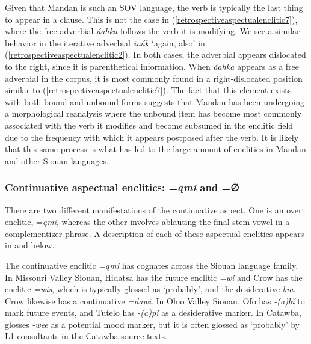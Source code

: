 Given that Mandan is such an SOV language, the verb is typically the last thing to appear in a clause. This is not the case in (\ref{retrospectiveaspectualenclitic7}), where the free adverbial \textit{áahka} follows the verb it is modifying. We see a similar behavior in the iterative adverbial \textit{inák} `again, also' in (\ref{retrospectiveaspectualenclitic2}). In both cases, the adverbial appears dislocated to the right, since it is parenthetical information. When \textit{áahka} appears as a free adverbial in the corpus, it is most commonly found in a right-dislocated position similar to (\ref{retrospectiveaspectualenclitic7}). The fact that this element exists with both bound and unbound forms suggests that Mandan has been undergoing a morphological reanalysis where the unbound item has become most commonly associated with the verb it modifies and become subsumed in the enclitic field due to the frequency with which it appears postposed after the verb. It is likely that this same process is what has led to the large amount of enclitics in Mandan and other Siouan languages.

\subsubsection{Continuative aspectual enclitics: =\textit{ąmi} and =∅}

There are two different manifestations of the continuative aspect. One is an overt enclitic, =\textit{ąmi}, whereas the other involves ablauting the final stem vowel in a complementizer phrase. A description of each of these aspectual enclitics appears in  and  below.

\label{Ch3SubSubContinuative1}

The continuative enclitic \textit{=ąmi} has cognates across the Siouan language family. In Missouri Valley Siouan, Hidatsa has the future enclitic \textit{=wi} and Crow has the enclitic \textit{=wis}, which is typically glossed as `probably', and the desiderative \textit{bia}. Crow likewise has a continuative \textit{=dawi}. In Ohio Valley Siouan, Ofo has \textit{-(a)b\u{i}} to mark future events, and Tutelo has \textit{-(a)pi} as a desiderative marker. In Catawba, \citet[54]{rudes2007a} glosses \textit{-wee} as a potential mood marker, but it is often glossed as `probably' by L1 consultants in the Catawba source texts.

